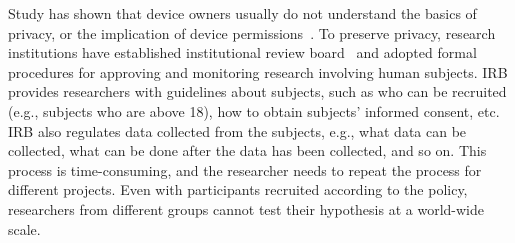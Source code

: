 Study has shown that device owners usually do not understand the 
basics of privacy, or the implication of device 
permissions~\cite{camp2015respecting}. 
To preserve privacy, research institutions have established 
institutional review board~\cite{irb} and adopted formal 
procedures for approving and monitoring research involving 
human subjects. IRB provides researchers with guidelines about 
subjects, such as who can be recruited (e.g., subjects
who are above 18), 
how to obtain subjects' informed consent, etc. IRB also 
regulates data collected from the subjects, e.g., what data can be collected, what can 
be done after the data has been collected, and so on. This
process is time-consuming, and the researcher needs to repeat
the process for different projects. Even with participants 
recruited according to the policy, researchers from different 
groups cannot test their hypothesis at a world-wide scale. 
  
